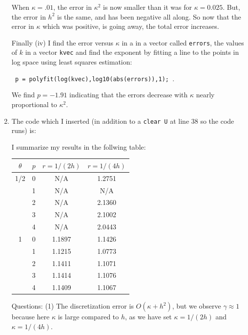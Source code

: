 \documentclass[11pt]{article}
\begin{document}
\begin{enumerate}
When $\kappa = .01$, the error in $\kappa^2$ is now smaller than it was for $\kappa = 0.025$. But, the error in $h^2$ is the same, and has been negative all along. So now that the error in $\kappa$ which was positive, is going away, the total error increases.

Finally (iv) I find the error versus $\kappa$ in a in a vector called \verb|errors|, the values of $k$ in a vector \verb|kvec| and find the exponent by fitting a line to the points in log space using least squares estimation: 

\verb| p = polyfit(log(kvec),log10(abs(errors)),1); |.

We find $p = -1.91$ indicating that the errors decrease with $\kappa$ nearly proportional to $\kappa ^2$.

\item The code which I inserted (in addition to a \verb|clear U| at line 38 so the code runs) is:



I summarize my results in the follwing table:
\begin{table}[h]
  \begin{center}
    \begin{tabular}{cccc}
      \hline
$\theta$ & $p$ & $r = 1/(2h)$ & $r=1/(4h)$ \\
      \hline
      \hline
1/2 & 0  & N/A & 1.2751  \\
     &  1  & N/A & N/A  \\
     &  2  & N/A & 2.1360 \\
     &  3  & N/A & 2.1002 \\
     &  4  & N/A & 2.0443 \\
1 & 0  & 1.1897 & 1.1426  \\
     &  1  & 1.1215 & 1.0773  \\
     &  2  & 1.1411 & 1.1071 \\
     &  3  & 1.1414 & 1.1076 \\
     &  4  & 1.1409 & 1.1067 \\
      \hline
    \end{tabular}
  \end{center}
\end{table}

Questions: (1) The discretization error is $O(\kappa + h^2 )$, but we observe $\gamma \approx 1$ because here $\kappa$ is large compared to $h$, as we have set $\kappa = 1/(2h)$ and $\kappa = 1/(4h)$.


\end{enumerate}
\end{document}
